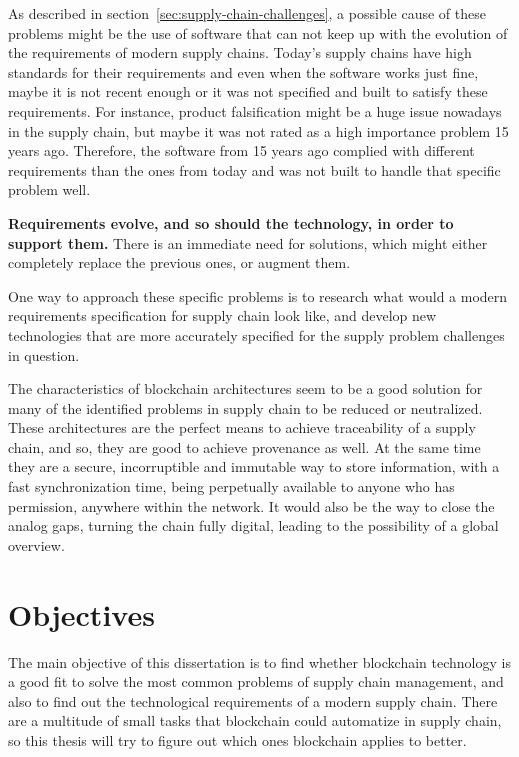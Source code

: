 As described in section~\ref{sec:supply-chain-challenges}, a possible cause of these problems might be the use of software that can not keep up with the evolution of the requirements of modern supply chains. Today's supply chains have high standards for their requirements and even when the software works just fine, maybe it is not recent enough or it was not specified and built to satisfy these requirements. For instance, product falsification might be a huge issue nowadays in the supply chain, but maybe it was not rated as a high importance problem 15 years ago. Therefore, the software from 15 years ago complied with different requirements than the ones from today and was not built to handle that specific problem well. 

\textbf{Requirements evolve, and so should the technology, in order to support them.} There is an immediate need for solutions, which might either completely replace the previous ones, or augment them.

One way to approach these specific problems is to research what would a modern requirements specification for supply chain look like, and develop new technologies that are more accurately specified for the supply problem challenges in question. 

The characteristics of blockchain architectures seem to be a good solution for many of the identified problems in supply chain to be reduced or neutralized. These architectures are the perfect means to achieve traceability of a supply chain, and so, they are good to achieve provenance as well. At the same time they are a secure, incorruptible and immutable way to store information, with a fast synchronization time, being perpetually available to anyone who has permission, anywhere within the network. It would also be the way to close the analog gaps, turning the chain fully digital, leading to the possibility of a global overview.

\section{Objectives}
\label{sec:objectives}
The main objective of this dissertation is to find whether blockchain technology is a good fit to solve the most common problems of supply chain management, and also to find out the technological requirements of a modern supply chain. There are a multitude of small tasks that blockchain could automatize in supply chain, so this thesis will try to figure out which ones blockchain applies to better. 

